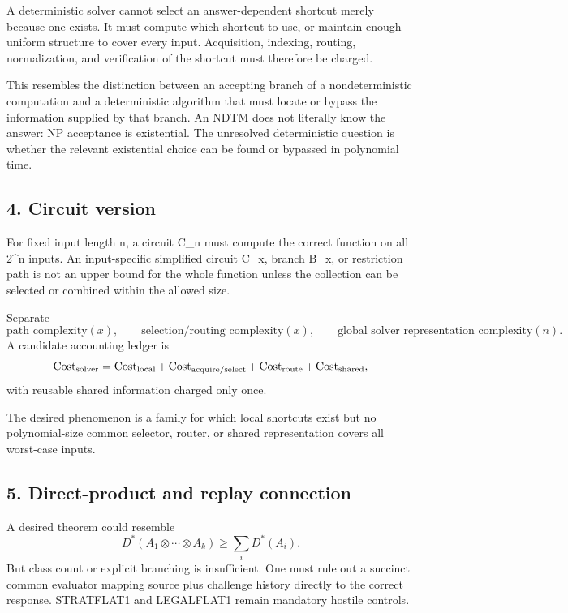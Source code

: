 A deterministic solver cannot select an answer-dependent shortcut merely because one exists. It must compute which shortcut to use, or maintain enough uniform structure to cover every input. Acquisition, indexing, routing, normalization, and verification of the shortcut must therefore be charged.

This resembles the distinction between an accepting branch of a nondeterministic computation and a deterministic algorithm that must locate or bypass the information supplied by that branch. An NDTM does not literally know the answer: NP acceptance is existential. The unresolved deterministic question is whether the relevant existential choice can be found or bypassed in polynomial time.

\subsection*{4. Circuit version}
For fixed input length n, a circuit C_n must compute the correct function on all 2^n inputs. An input-specific simplified circuit C_x, branch B_x, or restriction path is not an upper bound for the whole function unless the collection can be selected or combined within the allowed size.

Separate
\[
\text{path complexity}(x),\qquad
\text{selection/routing complexity}(x),\qquad
\text{global solver representation complexity}(n).
\]
A candidate accounting ledger is
\[
\operatorname{Cost}_{\rm solver}
=
\operatorname{Cost}_{\rm local}
+\operatorname{Cost}_{\rm acquire/select}
+\operatorname{Cost}_{\rm route}
+\operatorname{Cost}_{\rm shared},
\]
with reusable shared information charged only once.

The desired phenomenon is a family for which local shortcuts exist but no polynomial-size common selector, router, or shared representation covers all worst-case inputs.

\subsection*{5. Direct-product and replay connection}
A desired theorem could resemble
\[
D^*(A_1\otimes\cdots\otimes A_k)\ge\sum_iD^*(A_i).
\]
But class count or explicit branching is insufficient. One must rule out a succinct common evaluator mapping source plus challenge history directly to the correct response. STRATFLAT1 and LEGALFLAT1 remain mandatory hostile controls.

